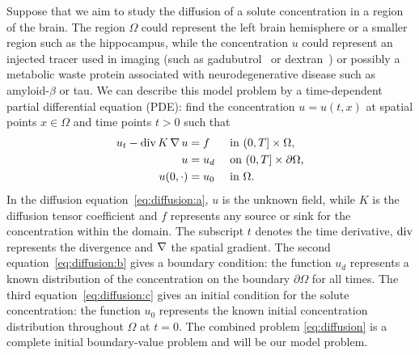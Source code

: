 Suppose that we aim to study the diffusion of a solute concentration
in a region of the brain. The region $\Omega$ could represent the left
brain hemisphere or a smaller region such as the hippocampus, while
the concentration $u$ could represent an injected tracer used in
imaging (such as gadubutrol~\cite{ringstad2018brain} or
dextran~\cite{iliff2013cerebral}) or possibly a metabolic waste
protein associated with neurodegenerative disease such as
amyloid-$\beta$ or tau. We can describe this model problem by a
time-dependent partial differential equation (PDE): find the
concentration $u = u(t, x)$ at spatial points $x \in \Omega$ and time
points $t > 0$ such that
\begin{subequations}
  \label{eq:diffusion}
  \begin{align}
    \label{eq:diffusion:a}
    u_t - \operatorname{\mathrm{div}} K \operatorname{\nabla} u &= f &&\text{ in } (0, T] \times \Omega, \\
    \label{eq:diffusion:b}
    u &= u_d && \text{ on } (0, T] \times \partial \Omega, \\
    \label{eq:diffusion:c}
    u(0, \cdot) &= u_0 && \text{ in } \Omega.
  \end{align}
\end{subequations}
In the diffusion equation~\eqref{eq:diffusion:a}, $u$ is the unknown
field, while $K$ is the diffusion tensor coefficient and $f$
represents any source or sink for the concentration within the
domain. The subscript $t$ denotes the time derivative, $\operatorname{\mathrm{div}}$
represents the divergence and $\operatorname{\nabla}$ the spatial gradient. The second
equation~\eqref{eq:diffusion:b} gives a boundary condition: the
function $u_d$ represents a known distribution of the concentration on
the boundary $\partial \Omega$ for all times. The third
equation~\eqref{eq:diffusion:c} gives an initial condition for the
solute concentration: the function $u_0$ represents the known initial
concentration distribution throughout $\Omega$ at $t=0$. The combined
problem \eqref{eq:diffusion} is a complete initial boundary-value
problem and will be our model problem.



